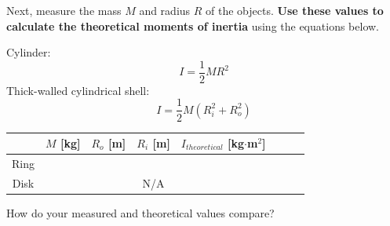\documentclass[11pt,letterpaper]{article}
\begin{document}
Next, measure the mass $M$ and radius $R$ of the objects. \textbf{Use these values to calculate the theoretical moments of inertia} using the equations below.

Cylinder:
$$I=\frac{1}{2}MR^2$$
Thick-walled cylindrical shell:
$$I=\frac{1}{2}M(R_i^2+R_o^2)$$

\begin{table}[h!]
\begin{tabular}{|c|c|c|c|c|c|c|c|}
\hline
& $M$ [kg] & $R_o$ [m] & $R_i$ [m] & $I_{theoretical}$ [kg$\cdot$m$^2$]\\
\hline Ring & \hspace{1.5cm} & \hspace{1.5cm} & \hspace{1.5cm} &  \hspace{1.5cm}\\
\hline Disk & & & N/A & \\
\hline
\end{tabular}
\end{table}

How do your measured and theoretical values compare?
\end{document}
